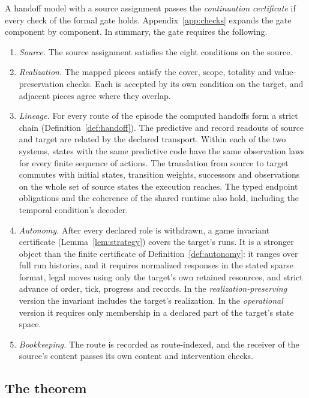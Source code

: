 \begin{definition}
\label{def:certificate}
A handoff model with a source assignment passes the \emph{continuation
certificate} if every check of the formal gate holds. Appendix~\ref{app:checks}
expands the gate component by component. In summary, the gate requires the following.
\begin{enumerate}
\item \emph{Source.} The source assignment satisfies the eight conditions on
the source.
\item \emph{Realization.} The mapped pieces satisfy the cover, scope,
totality and value-preservation checks. Each is accepted by its own condition
on the target, and adjacent pieces agree where they overlap.
\item \emph{Lineage.} For every route of the episode the computed handoffs
form a strict chain (Definition~\ref{def:handoff}). The predictive and
record readouts of source and target are related by the declared transport.
Within each of the two systems, states with the same predictive code have the
same observation laws for every finite sequence of actions. The translation
from source to target commutes with initial states, transition weights,
successors and observations on the whole set of source states the execution
reaches. The typed endpoint obligations and the coherence of the shared
runtime also hold, including the temporal condition's decoder.
\item \emph{Autonomy.} After every declared role is withdrawn, a game
invariant certificate (Lemma~\ref{lem:strategy}) covers the target's runs. It
is a stronger object than the finite certificate of
Definition~\ref{def:autonomy}: it ranges over full run histories, and it
requires normalized responses in the stated sparse format, legal moves using
only the target's own retained resources, and strict advance of order, tick,
progress and records. In the \emph{realization-preserving} version the
invariant includes the target's realization. In the \emph{operational}
version it requires only membership in a declared part of the target's state
space.
\item \emph{Bookkeeping.} The route is recorded as route-indexed, and the
receiver of the source's content passes its own content and intervention
checks.
\end{enumerate}
\end{definition}

\subsection{The theorem}

